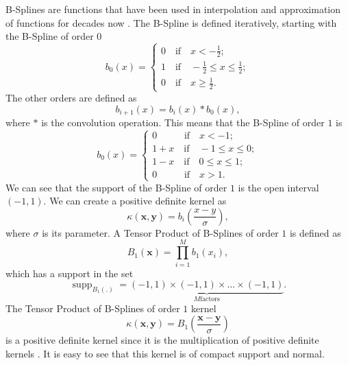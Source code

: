 B-Splines are functions that have been used in interpolation and approximation of functions for decades now \cite{boor_box_1993}. The B-Spline is defined iteratively, starting with the B-Spline of order $0$
\begin{equation}
    b_0(x) = \begin{cases}
            0 \quad \text{if}  \quad x<-\frac{1}{2};\\
            1 \quad \text{if}  \quad -\frac{1}{2} \leq x \leq \frac{1}{2};\\
            0 \quad \text{if}  \quad x \geq \frac{1}{2}.
    \end{cases}
\end{equation}
The other orders are defined as
\begin{equation}
    b_{i+1}(x) = b_i(x)*b_0(x),
\end{equation}
where $*$ is the convolution operation. This means that the B-Spline of order $1$ is
\begin{equation}
    b_0(x) = \begin{cases}
            0 \quad \quad \;\;\; \text{if}  \quad x<-1;\\
            1+x \quad \text{if}  \quad -1 \leq x \leq 0;\\
            1-x \quad \text{if}  \quad 0 \leq x \leq 1;\\
            0 \quad \quad \;\;\; \text{if}  \quad x > 1.
    \end{cases}
\end{equation}
We can see that the support of the B-Spline of order $1$ is the open interval $(-1,1)$.
We can create a positive definite kernel as \cite{scholkopf_learning_2002}
\begin{equation*}
    \kappa(\mathbf{x},\mathbf{y}) = b_i\left( \frac{x-y}{\sigma}\right),
\end{equation*}
where $\sigma$ is its parameter.
A Tensor Product of B-Splines of order $1$ is defined as
\begin{equation}
    B_1(\mathbf{x}) = \prod_{i=1}^{M}b_1(x_i),
\end{equation}
which has a support in the set
\begin{equation*}
    \operatorname{supp}_{B_1(.)} = \underbrace{(-1,1)\times(-1,1)\times \dots\times(-1,1)}_{M \text{factors}}.
\end{equation*}
The Tensor Product of B-Splines of order $1$ kernel
\begin{equation*}
    \kappa(\mathbf{x},\mathbf{y}) = B_1\left( \frac{\mathbf{x} - \mathbf{y}}{\sigma} \right)
\end{equation*}
is a positive definite kernel since it is the multiplication of positive definite kernels \cite{aronszajn_theory_1950}.
It is easy to see that this kernel is of compact support and normal.

